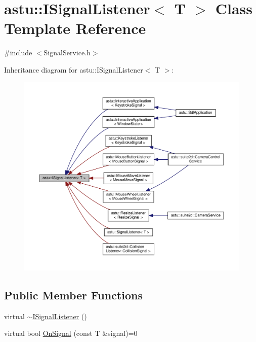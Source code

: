 \hypertarget{classastu_1_1ISignalListener}{}\section{astu\+:\+:I\+Signal\+Listener$<$ T $>$ Class Template Reference}
\label{classastu_1_1ISignalListener}


{\ttfamily \#include $<$Signal\+Service.\+h$>$}



Inheritance diagram for astu\+:\+:I\+Signal\+Listener$<$ T $>$\+:\nopagebreak
\begin{figure}[H]
\begin{center}
\leavevmode
\includegraphics[width=350pt]{classastu_1_1ISignalListener__inherit__graph}
\end{center}
\end{figure}
\subsection*{Public Member Functions}
\begin{DoxyCompactItemize}
\item 
virtual \hyperlink{classastu_1_1ISignalListener_ae08b22a5ecb4f1db39336ab0c3139c68}{$\sim$\+I\+Signal\+Listener} ()
\item 
virtual bool \hyperlink{classastu_1_1ISignalListener_a2ae8168f23b6daa3416f6e5995fd5d31}{On\+Signal} (const T \&signal)=0
\end{DoxyCompactItemize}


